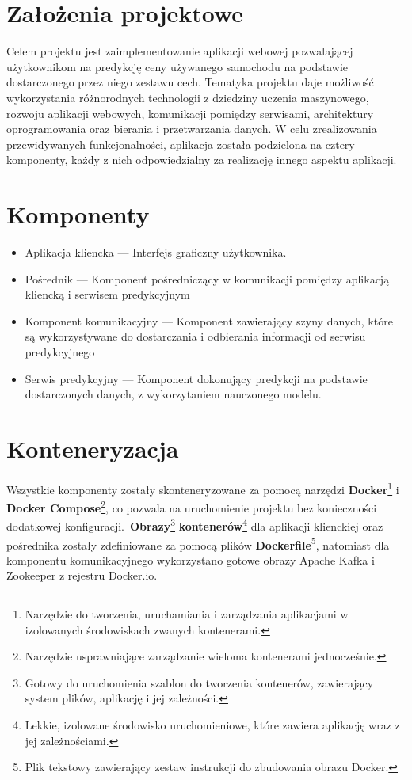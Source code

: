 \documentclass[12pt, a4paper]{report}
\begin{document}
\section{Założenia projektowe}
Celem projektu jest zaimplementowanie aplikacji webowej pozwalającej użytkownikom na predykcję 
ceny używanego samochodu na podstawie dostarczonego przez niego zestawu cech. Tematyka projektu
daje możliwość wykorzystania różnorodnych technologii z dziedziny uczenia maszynowego, rozwoju
aplikacji webowych, komunikacji pomiędzy serwisami, architektury oprogramowania oraz bierania i 
przetwarzania danych. W celu zrealizowania przewidywanych funkcjonalności, aplikacja została
podzielona na cztery komponenty, każdy z nich odpowiedzialny za realizację innego aspektu
aplikacji.
\section{Komponenty}
\begin{itemize}
    \item Aplikacja kliencka --- Interfejs graficzny użytkownika.
    \item Pośrednik --- Komponent pośredniczący w komunikacji pomiędzy aplikacją kliencką i serwisem predykcyjnym
    \item Komponent komunikacyjny --- Komponent zawierający szyny danych, które są wykorzystywane do dostarczania i odbierania informacji od serwisu predykcyjnego
    \item Serwis predykcyjny --- Komponent dokonujący predykcji na podstawie dostarczonych danych, z wykorzytaniem nauczonego modelu.
\end{itemize}

\section{Konteneryzacja}
Wszystkie komponenty zostały skonteneryzowane za pomocą narzędzi
\textbf{Docker}\footnote{Narzędzie do tworzenia, uruchamiania i zarządzania aplikacjami w izolowanych środowiskach zwanych kontenerami.}
i \textbf{Docker Compose}\footnote{Narzędzie usprawniające zarządzanie wieloma kontenerami jednocześnie.}, co pozwala na uruchomienie projektu
bez konieczności dodatkowej konfiguracji.\ \textbf{Obrazy}\footnote{Gotowy do uruchomienia szablon do tworzenia kontenerów, zawierający system plików, aplikację i jej zależności.}
\textbf{kontenerów}\footnote{Lekkie, izolowane środowisko uruchomieniowe, które zawiera aplikację wraz z jej zależnościami.}
dla aplikacji klienckiej oraz pośrednika zostały zdefiniowane za pomocą
plików \textbf{Dockerfile}\footnote{Plik tekstowy zawierający zestaw instrukcji do zbudowania obrazu Docker.},
natomiast dla komponentu komunikacyjnego wykorzystano gotowe obrazy Apache Kafka i Zookeeper z rejestru Docker.io.
\end{document}
